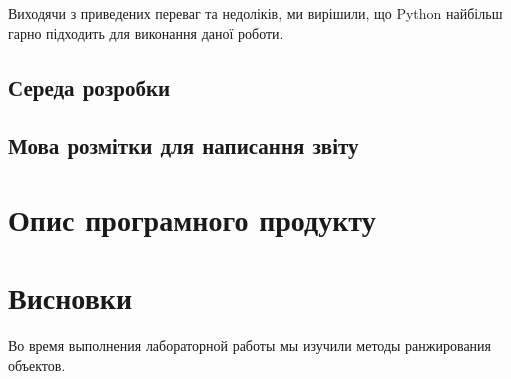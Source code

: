 \documentclass[a4paper,14pt]{extarticle}
\begin{document}
Виходячи з приведених переваг та недоліків, ми вирішили, що
Python найбільш гарно підходить для виконання даної роботи.

\subsection{Середа розробки}


\subsection{Мова розмітки для написання звіту}


\section{}

\section{Опис програмного продукту}

\section*{Висновки}
Во время выполнения лабораторной работы мы 
изучили методы ранжирования объектов.
\end{document}
